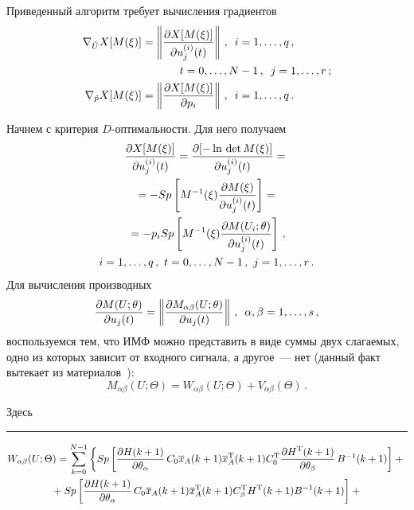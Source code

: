 \begin{multicols}{2}
\smallskip
\addtocounter{table}{1}


Приведенный алгоритм требует вычисления градиентов
\begin{align*}
\nabla_{\tilde{U}} X[M(\xi)]&=\left\Vert \fr{\partial X[M(\xi)]}{\partial
u_j^{(i)}(t)}\right\Vert\,,\enskip i=1, \ldots ,q\,,\\
&\hspace*{12mm}t=0, \ldots , N-1\,,\enskip j=1, \ldots ,r\,;\\
\nabla_{\tilde{p}} X[M(\xi)] &=\left\Vert \fr{\partial X [M(\xi)]}{\partial
p_i}\right\Vert\,,\enskip i=1, \ldots ,q\,.
\end{align*}

  Начнем с критерия $D$-оп\-ти\-маль\-ности. Для него получаем
  \begin{multline*}
  \displaystyle\frac{\displaystyle \partial X[M(\xi)]\mathstrut}{\displaystyle \partial u_j^{(i)}(t)\mathstrut}=\displaystyle\frac{\displaystyle \partial [-
\ln\,\mathrm{det}\,M(\xi)]\mathstrut}{\displaystyle \partial u_j^{(i)}(t)\mathstrut}={}\\
{}=
  -Sp\left[ M^{-1}(\xi)\displaystyle\frac{\displaystyle \partial M(\xi)\mathstrut}{\displaystyle \partial u_j^{(i)}(t)\mathstrut}\right] ={}\\
  {}=-p_i
Sp\left[M^{-1}(\xi)\displaystyle\frac{\displaystyle \partial M(U_i;\theta)\mathstrut}{\displaystyle \partial u_j^{(i)}(t)\mathstrut}\right]\,,\\
  i=1, \ldots ,q\,,\ t=0, \ldots , N-1\,,\ j=1, \ldots ,r\,.
  \end{multline*}
Для вычисления производных
$$
\displaystyle\frac{\displaystyle \partial M(U;\theta)\mathstrut}{\displaystyle \partial u_j(t)\mathstrut}=
\left\Vert \displaystyle\frac{\displaystyle \partial M_{\alpha\beta}(U;\theta)\mathstrut}{\displaystyle \partial u_j(t)\mathstrut}\right\Vert\,,\enskip
\alpha, \beta=1, \ldots , s\,,
$$
воспользуемся тем, что ИМФ можно представить в виде суммы двух слагаемых,
одно из которых зависит от входного сигнала, а другое~--- нет (данный факт
вытекает из материалов~\cite{19-c}):
$$
M_{\alpha\beta}(U;\Theta)=W_{\alpha\beta}(U;\Theta)+V_{\alpha\beta}(\Theta)\,.
$$

\noindent
Здесь

\end{multicols}

\hrule


\begin{multline*}
W_{\alpha\beta}(U;\Theta)=
\sum\limits_{k=0}^{N-1}\left \{
Sp\left [
\displaystyle\frac{\displaystyle \partial H(k+1)\mathstrut}{\displaystyle \partial
\theta_\alpha\mathstrut}\,C_0\overline{x}_A(k+1)\overline{x}_A^{\mathrm{T}}(k+1)C_0^{\mathrm{T}}\displaystyle\frac{\displaystyle \partial
H^{\mathrm{T}}(k+1)\mathstrut}{\displaystyle \partial \theta_\beta\mathstrut}\,B^{-1}(k+1)\right ]+{}\right.\\
{}+Sp\left[\displaystyle\frac{\displaystyle \partial H(k+1)\mathstrut}{\displaystyle \partial\theta_\alpha\mathstrut}\,C_0\overline{x}_A(k+1)
\overline{x}_A^{\mathrm{T}}(k+1)C_{\beta}^{\mathrm{T}} H^{\mathrm{T}}(k+1) B^{-1}(k+1)\right]+{}
\end{multline*}

